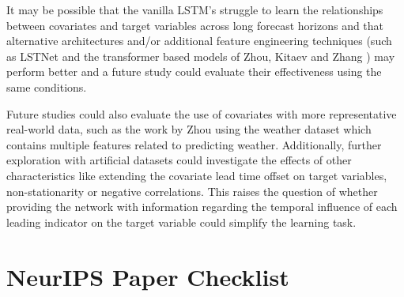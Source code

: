\documentclass[letterpaper]{article}
\begin{document}
It may be possible that the vanilla LSTM's struggle to learn the relationships between covariates and target variables 
across long forecast horizons and that alternative architectures and/or additional feature engineering techniques (such as LSTNet \cite{lai2018modeling} and the transformer based models
 of Zhou, Kitaev and Zhang \cite{zhou2021informer,kitaev2020reformer,zhang2023crossformer}) may perform better and a future study could evaluate their effectiveness using the same conditions. 

Future studies could also evaluate the use of covariates with more representative 
real-world data, such as the work by Zhou \cite{zhou2021informer} using the weather dataset which contains multiple features related to predicting weather. 
Additionally, further exploration with artificial datasets could investigate the effects of other characteristics like 
extending the covariate lead time offset on target variables, non-stationarity or negative correlations. This raises the question of whether providing 
the network with information regarding the temporal influence of each leading indicator on the target variable could simplify the learning task.





\newpage
\section*{NeurIPS Paper Checklist}
\end{document}
